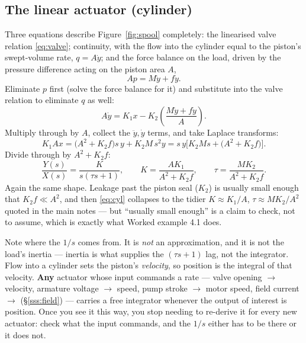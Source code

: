 \documentclass[11pt,a4paper]{article}
\begin{document}
\subsection{The linear actuator (cylinder)}
\label{sss:cylinder}

Three equations describe Figure~\ref{fig:spool} completely: the linearised
valve relation \eqref{eq:valve}; continuity, with the flow into the cylinder
equal to the piston's swept-volume rate, $q=A\dot y$; and the force balance on
the load, driven by the pressure difference acting on the piston area $A$,
\[
  Ap = M\ddot y + f\dot y .
\]
Eliminate $p$ first (solve the force balance for it) and substitute into the
valve relation to eliminate $q$ as well:
\[
  A\dot y = K_{1}x - K_{2}\left(\frac{M\ddot y+f\dot y}{A}\right).
\]
Multiply through by $A$, collect the $\ddot y,\dot y$ terms, and take Laplace
transforms:
\[
  K_{1}Ax = \bigl(A^{2}+K_{2}f\bigr)s\,y + K_{2}M\,s^{2}y
  = s\,y\bigl[K_{2}M s + \bigl(A^{2}+K_{2}f\bigr)\bigr] .
\]
Divide through by $A^{2}+K_{2}f$:
\begin{equation}
  \frac{Y(s)}{X(s)}=\frac{K}{s(\tau s+1)},
  \qquad
  K=\frac{AK_{1}}{A^{2}+K_{2}f},
  \qquad
  \tau=\frac{MK_{2}}{A^{2}+K_{2}f} .
  \label{eq:cyl}
\end{equation}
Again the same shape. Leakage past the piston seal ($K_{2}$) is usually small
enough that $K_{2}f\ll A^{2}$, and then \eqref{eq:cyl} collapses to the tidier
$K\approx K_{1}/A$, $\tau\approx MK_{2}/A^{2}$ quoted in the main notes --- but
``usually small enough'' is a claim to check, not to assume, which is exactly
what Worked example 4.1 does.

\begin{pitfall}
Note where the $1/s$ comes from. It is \emph{not} an approximation, and it is
not the load's inertia --- inertia is what supplies the $(\tau s+1)$ lag, not
the integrator. Flow into a cylinder sets the piston's \emph{velocity}, so
position is the integral of that velocity. \textbf{Any} actuator whose input
commands a rate --- valve opening $\to$ velocity, armature voltage $\to$
speed, pump stroke $\to$ motor speed, field current $\to$ (\S\ref{sss:field})
--- carries a free integrator whenever the output of interest is position.
Once you see it this way, you stop needing to re-derive it for every new
actuator: check what the input commands, and the $1/s$ either has to be there
or it does not.
\end{pitfall}
\end{document}
